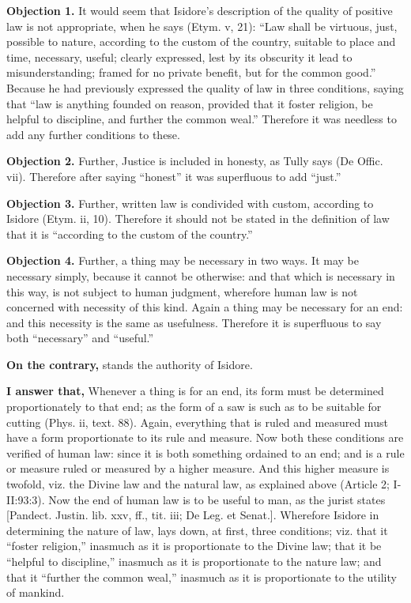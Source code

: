 
\textbf{Objection 1.} It would seem that Isidore's description of the quality of positive law is not appropriate, when he says (Etym. v, 21): ``Law shall be virtuous, just, possible to nature, according to the custom of the country, suitable to place and time, necessary, useful; clearly expressed, lest by its obscurity it lead to misunderstanding; framed for no private benefit, but for the common good.'' Because he had previously expressed the quality of law in three conditions, saying that ``law is anything founded on reason, provided that it foster religion, be helpful to discipline, and further the common weal.'' Therefore it was needless to add any further conditions to these.

\textbf{Objection 2.} Further, Justice is included in honesty, as Tully says (De Offic. vii). Therefore after saying ``honest'' it was superfluous to add ``just.''

\textbf{Objection 3.} Further, written law is condivided with custom, according to Isidore (Etym. ii, 10). Therefore it should not be stated in the definition of law that it is ``according to the custom of the country.''

\textbf{Objection 4.} Further, a thing may be necessary in two ways. It may be necessary simply, because it cannot be otherwise: and that which is necessary in this way, is not subject to human judgment, wherefore human law is not concerned with necessity of this kind. Again a thing may be necessary for an end: and this necessity is the same as usefulness. Therefore it is superfluous to say both ``necessary'' and ``useful.''

\textbf{On the contrary,} stands the authority of Isidore.

\textbf{I answer that,} Whenever a thing is for an end, its form must be determined proportionately to that end; as the form of a saw is such as to be suitable for cutting (Phys. ii, text. 88). Again, everything that is ruled and measured must have a form proportionate to its rule and measure. Now both these conditions are verified of human law: since it is both something ordained to an end; and is a rule or measure ruled or measured by a higher measure. And this higher measure is twofold, viz. the Divine law and the natural law, as explained above (Article 2; I-II:93:3). Now the end of human law is to be useful to man, as the jurist states [Pandect. Justin. lib. xxv, ff., tit. iii; De Leg. et Senat.]. Wherefore Isidore in determining the nature of law, lays down, at first, three conditions; viz. that it ``foster religion,'' inasmuch as it is proportionate to the Divine law; that it be ``helpful to discipline,'' inasmuch as it is proportionate to the nature law; and that it ``further the common weal,'' inasmuch as it is proportionate to the utility of mankind.

